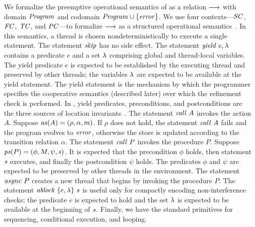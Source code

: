 We formalize the preemptive operational semantics of \civl as a relation $\longrightarrow$ with domain $\mathit{Program}$ and 
codomain $\mathit{Program} \cup \{\mathit{error}\}$.
We use four contexts---$\mathit{SC}$, $\mathit{FC}$, $\mathit{TC}$, and $\mathit{PC}$---to formalize $\longrightarrow$
as a structured operational semantics~\cite{WrightF94}.
In this semantics, a thread is chosen nondeterministically to execute a single statement.
The statement $\mathit{skip}$ has no side effect.
The statement $\mathit{yield}\ e,\lambda$ contains a predicate $e$ and a set $\lambda$ comprising global and thread-local variables.
The yield predicate $e$ is expected to be established by the executing thread and preserved by other threads;
the variables $\lambda$ are expected to be available at the yield statement.
The yield statement is the mechanism by which the programmer specifies the cooperative semantics (described later) over which 
the refinement check is performed.
In \civl, yield predicates, preconditions, and postconditions are the three sources of location invariants~\cite{OwickiG76}.
The statement $\mathit{call}\ A$ invokes the action $A$.
Suppose $\mathit{as}(A) = (\rho, \alpha, m)$.
If $\rho$ does not hold, the statement $\mathit{call}\ A$ fails and the program evolves to $\mathit{error}$, 
otherwise the store is updated according to the transition relation $\alpha$.
The statement $\mathit{call}\ P$ invokes the procedure $P$.
Suppose $\mathit{ps}(P) = (\phi, M, \psi, \mathit{s})$.
It is expected that the precondition $\phi$ holds, then statement $\mathit{s}$ executes, and finally the postcondition $\psi$ holds.
The predicates $\phi$ and $\psi$ are expected to be preserved by other threads in the environment. 
The statement $\mathit{async}\ P$ creates a new thread that begins by invoking the procedure $P$.
The statement $\mathit{ablock}\ {\{e,\lambda\}}\ {\mathit{s}}$ is useful only for compactly encoding non-interference checks;
the predicate $e$ is expected to hold and the set $\lambda$ is expected to be available at the beginning of $\mathit{s}$.
Finally, we have the standard primitives for sequencing, conditional execution, and looping.

